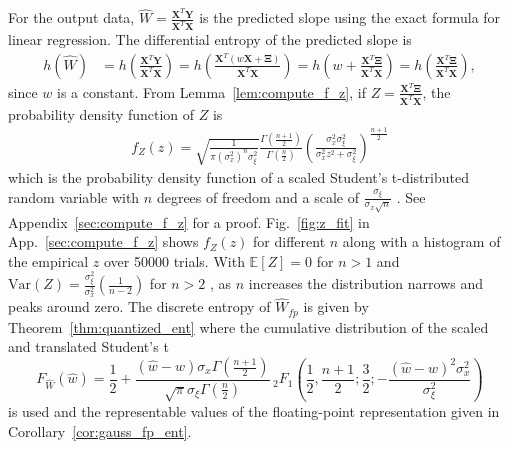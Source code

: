 \documentclass[12pt,onecolumn, margin=1in]{IEEEtran}
\newcommand{\paren}[1]{\left( #1 \right)}
\newcommand{\E}[1]{\mathbb{E}\left[ #1 \right]}
\newcommand{\bX}{\boldsymbol{X}}
\newcommand{\bY}{\boldsymbol{Y}}
\newcommand{\bXi}{\boldsymbol{\Xi}}
\newcommand{\Wh}{\hat{W}}
\newcommand{\wh}{\hat{w}}
\newcommand{\sigx}{\sigma_x}
\newcommand{\sigxi}{\sigma_\xi}
\begin{document}
For the output data, $\Wh = \frac{\bX^T\bY}{\bX^T\bX}$ is the predicted slope using the exact formula for linear regression. The differential entropy of the predicted slope is
\begin{align}
h(\Wh) &= h\paren{\frac{\bX^T\bY}{\bX^T\bX}} = h\paren{\frac{\bX^T(w\bX + \bXi)}{\bX^T\bX}} = h\paren{w + \frac{\bX^T\bXi}{\bX^T\bX}} = h\paren{\frac{\bX^T\bXi}{\bX^T\bX}},
\end{align}
since $w$ is a constant. From Lemma~\ref{lem:compute_f_z}, if $Z = \frac{\bX^T\bXi}{\bX^T\bX}$, the probability density function of $Z$ is
\begin{align}
    f_Z(z) = \sqrt{\frac{1}{\pi\paren{\sigx^2}^n\sigxi^2}}\frac{\Gamma\paren{\frac{n+1}{2}}}{\Gamma\paren{\frac{n}{2}}}\paren{\frac{\sigx^2\sigxi^2}{\sigx^2z^2 + \sigxi^2}}^{\frac{n + 1}{2}}\label{eq:exact_final_dist}
\end{align}
which is the probability density function of a scaled Student's t-distributed random variable with $n$ degrees of freedom and a scale of $\frac{\sigxi}{\sigx\sqrt{n}}$ \cite{JohnsonNormanLloyd1994Cud}. 
See Appendix~\ref{sec:compute_f_z} for a proof. Fig.~\ref{fig:z_fit} in App.~\ref{sec:compute_f_z} shows $f_Z(z)$ for different $n$ along with a histogram of the empirical $z$ over 50000 trials. With $\E{Z} = 0$ for $n > 1$ and $\mathrm{Var}(Z) = \frac{\sigxi^2}{\sigx^2}\paren{\frac{1}{n-2}}$ for $n > 2$ \cite{JohnsonNormanLloyd1994Cud}, as $n$ increases the distribution narrows and peaks around zero.
The discrete entropy of $\Wh_{fp}$ is given by Theorem~\ref{thm:quantized_ent} where the cumulative distribution of the scaled and translated Student's t \cite{JohnsonNormanLloyd1994Cud}
\begin{equation}\label{eq:wh_cdf}
F_{\Wh}(\wh) = \frac{1}{2} + \frac{(\wh-w) \sigma_x \Gamma \left(\frac{n+1}{2}\right)}{\sqrt{\pi } \sigma_\xi \Gamma \left(\frac{n}{2}\right)} \, _2F_1\left(\frac{1}{2},\frac{n+1}{2};\frac{3}{2};-\frac{(\wh-w)^2 \sigma_x^2}{\sigma_\xi^2}\right)
\end{equation}
is used and the representable values of the floating-point representation given in Corollary~\ref{cor:gauss_fp_ent}. 
\end{document}

